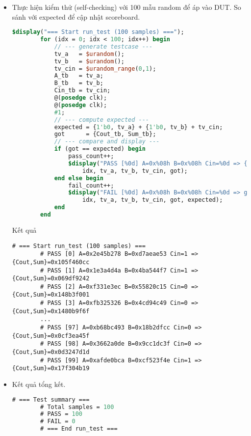 \begin{itemize}[label=-]
	\item Thực hiện kiểm thử (self-checking) với 100 mẫu random để áp vào DUT. So sánh với expected để cập nhật scoreboard.
	
	\begin{lstlisting}[style=StyleCode, language=SystemVerilog, caption={Sinh 100 mẫu random và thực hiện kiểm tra.}]
		$display("=== Start run_test (100 samples) ===");
		for (idx = 0; idx < 100; idx++) begin
			// --- generate testcase ---
			tv_a   = $urandom();
			tv_b   = $urandom();
			tv_cin = $urandom_range(0,1);
			A_tb   = tv_a;
			B_tb   = tv_b;
			Cin_tb = tv_cin;
			@(posedge clk);
			@(posedge clk);
			#1;
			// --- compute expected ---
			expected = {1'b0, tv_a} + {1'b0, tv_b} + tv_cin;
			got      = {Cout_tb, Sum_tb};
			// --- compare and display ---
			if (got == expected) begin
				pass_count++;
				$display("PASS [%0d] A=0x%08h B=0x%08h Cin=%0d => {Cout,Sum}=0x%09h",
					idx, tv_a, tv_b, tv_cin, got);
			end else begin
				fail_count++;
				$display("FAIL [%0d] A=0x%08h B=0x%08h Cin=%0d => got=0x%09h (exp=0x%09h)",
					idx, tv_a, tv_b, tv_cin, got, expected);
			end
		end
	\end{lstlisting}
	
	Kết quả
	
	\begin{lstlisting}[style=StyleResult, language=Result, caption={Kết quả test từng mẫu.}]
		# === Start run_test (100 samples) ===
		# PASS [0] A=0x2e45b278 B=0xd7aeae53 Cin=1 => {Cout,Sum}=0x105f460cc
		# PASS [1] A=0x1e3a4d4a B=0x4ba544f7 Cin=1 => {Cout,Sum}=0x069df9242
		# PASS [2] A=0xf331e3ec B=0x55820c15 Cin=0 => {Cout,Sum}=0x148b3f001
		# PASS [3] A=0xfb325326 B=0x4cd94c49 Cin=0 => {Cout,Sum}=0x1480b9f6f
		...
		# PASS [97] A=0xb68bc493 B=0x18b2dfcc Cin=0 => {Cout,Sum}=0x0cf3ea45f
		# PASS [98] A=0x3662a0de B=0x9cc1dc3f Cin=0 => {Cout,Sum}=0x0d3247d1d
		# PASS [99] A=0xafde0bca B=0xcf523f4e Cin=1 => {Cout,Sum}=0x17f304b19
	\end{lstlisting}
	
	\item Kết quả tổng kết.
	
	\begin{lstlisting}[style=StyleResult, language=SystemVerilog, caption={Kết quả của tổng kết của bài test.}]
		# === Test summary ===
		# Total samples = 100
		# PASS = 100
		# FAIL = 0
		# === End run_test ===
	\end{lstlisting}
\end{itemize}
